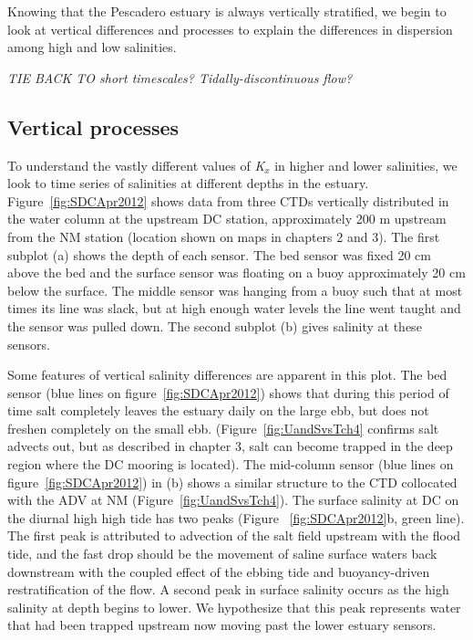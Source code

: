 Knowing that the Pescadero estuary is always vertically stratified, we begin to look at vertical differences and processes to explain the differences in dispersion among high and low salinities. 

\emph{TIE BACK TO short timescales? Tidally-discontinuous flow?}

\subsection{Vertical processes}

To understand the vastly different values of \emph{K$_x$} in higher and lower salinities, we look to time series of salinities at different depths in the estuary. Figure~\ref{fig:SDCApr2012} shows data from three CTDs vertically distributed in the water column at the upstream DC station, approximately 200 m upstream from the NM station (location shown on maps in chapters 2 and 3). The first subplot (a) shows the depth of each sensor. The bed sensor was fixed 20 cm above the bed and the surface sensor was floating on a buoy approximately 20 cm below the surface. The middle sensor was hanging from a buoy such that at most times its line was slack, but at high enough water levels the line went taught and the sensor was pulled down. The second subplot (b) gives salinity at these sensors.

Some features of vertical salinity differences are apparent in this plot. The bed sensor (blue lines on figure~\ref{fig:SDCApr2012}) shows that during this period of time salt completely leaves the estuary daily on the large ebb, but does not freshen completely on the small ebb. (Figure~\ref{fig:UandSvsTch4} confirms salt advects out, but as described in chapter 3, salt can become trapped in the deep region where the DC mooring is located). The mid-column sensor (blue lines on figure~\ref{fig:SDCApr2012}) in (b) shows a similar structure to the CTD collocated with the ADV at NM (Figure~\ref{fig:UandSvsTch4}). The surface salinity at DC on the diurnal high high tide has two peaks (Figure ~\ref{fig:SDCApr2012}b, green line). The first peak is attributed to advection of the salt field upstream with the flood tide, and the fast drop should be the movement of saline surface waters back downstream with the coupled effect of the ebbing tide and buoyancy-driven restratification of the flow. A second peak in surface salinity occurs as the high salinity at depth begins to lower. We hypothesize that this peak represents water that had been trapped upstream now moving past the lower estuary sensors. 

